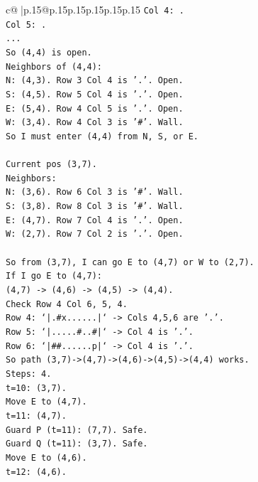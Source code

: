 \documentclass{article}
\begin{document}
{\begin{supertabular}{c@{$\;$}|p{.15\linewidth}@{}p{.15\linewidth}p{.15\linewidth}p{.15\linewidth}p{.15\linewidth}p{.15\linewidth}}
{{{\texttt{Col 4: .} \\
\texttt{Col 5: .} \\
\texttt{...} \\
\texttt{So (4,4) is open.} \\
\texttt{Neighbors of (4,4):} \\
\texttt{N: (4,3). Row 3 Col 4 is '.'. Open.} \\
\texttt{S: (4,5). Row 5 Col 4 is '.'. Open.} \\
\texttt{E: (5,4). Row 4 Col 5 is '.'. Open.} \\
\texttt{W: (3,4). Row 4 Col 3 is '\#'. Wall.} \\
\texttt{So I must enter (4,4) from N, S, or E.} \\
\\ 
\texttt{Current pos (3,7).} \\
\texttt{Neighbors:} \\
\texttt{N: (3,6). Row 6 Col 3 is '\#'. Wall.} \\
\texttt{S: (3,8). Row 8 Col 3 is '\#'. Wall.} \\
\texttt{E: (4,7). Row 7 Col 4 is '.'. Open.} \\
\texttt{W: (2,7). Row 7 Col 2 is '.'. Open.} \\
\\ 
\texttt{So from (3,7), I can go E to (4,7) or W to (2,7).} \\
\texttt{If I go E to (4,7):} \\
\texttt{(4,7) {-}> (4,6) {-}> (4,5) {-}> (4,4).} \\
\texttt{Check Row 4 Col 6, 5, 4.} \\
\texttt{Row 4: `|.\#x......|` {-}> Cols 4,5,6 are '.'.} \\
\texttt{Row 5: `|.....\#..\#|` {-}> Col 4 is '.'.} \\
\texttt{Row 6: `|\#\#......p|` {-}> Col 4 is '.'.} \\
\texttt{So path (3,7){-}>(4,7){-}>(4,6){-}>(4,5){-}>(4,4) works.} \\
\texttt{Steps: 4.} \\
\texttt{t=10: (3,7).} \\
\texttt{Move E to (4,7).} \\
\texttt{t=11: (4,7).} \\
\texttt{Guard P (t=11): (7,7). Safe.} \\
\texttt{Guard Q (t=11): (3,7). Safe.} \\
\texttt{Move E to (4,6).} \\
\texttt{t=12: (4,6).} \\
}}}
\end{supertabular}}
\end{document}
